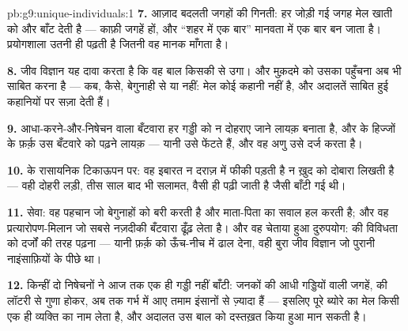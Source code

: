 \begin{solution}{pb:g9:unique-individuals:1}
\textbf{7.} आज़ाद बदलती जगहों की गिनती: हर जोड़ी गई जगह मेल खाती 
को और बाँट देती है --- काफ़ी जगहें हों, और ``शहर में एक बार'' मानवता में
एक बार बन जाता है। प्रयोगशाला उतनी ही पढ़ती है जितनी वह मानक माँगता है।

\textbf{8.} जीव विज्ञान यह दावा करता है कि वह बाल किसकी  से उगा।
और मुक़दमे को उसका पहुँचना अब भी साबित करना है --- कब, कैसे, बेगुनाही से
या नहीं: मेल कोई कहानी नहीं है, और अदालतें साबित हुई कहानियों पर सज़ा
देती हैं।

\textbf{9.} आधा-करने-और-निषेचन वाला बँटवारा हर गड्डी को न दोहराए जाने
लायक़ बनाता है, और  के हिज्जों के फ़र्क़ उस बँटवारे को पढ़ने लायक़ ---
यानी  उसे फेंटते हैं, और वह अणु उसे दर्ज करता है।

\textbf{10.}  के रासायनिक टिकाऊपन पर: वह इबारत न दराज़ में फीकी पड़ती
है न ख़ुद को दोबारा लिखती है --- वही दोहरी लड़ी, तीस साल बाद भी सलामत,
वैसी ही पढ़ी जाती है जैसी बाँटी गई थी।

\textbf{11.} सेवा: वह पहचान जो बेगुनाहों को बरी करती है और माता-पिता का
सवाल हल करती है; और वह प्रत्यारोपण-मिलान जो सबसे नज़दीकी बँटवारा ढूँढ़
लेता है। और वह चेताया हुआ दुरुपयोग:  की विविधता को दर्जों की तरह
पढ़ना --- यानी फ़र्क़ को ऊँच-नीच में ढाल देना, वही बुरा जीव विज्ञान जो
पुरानी नाइंसाफ़ियों के पीछे था।

\textbf{12.} किन्हीं दो निषेचनों ने आज तक एक ही गड्डी नहीं बाँटी: जनकों
की आधी गड्डियों वाली जगहें,  की लॉटरी से गुणा होकर, अब तक गर्भ
में आए तमाम इंसानों से ज़्यादा हैं --- इसलिए पूरे ब्योरे का मेल किसी एक
ही व्यक्ति का नाम लेता है, और अदालत उस बाल को दस्तख़त किया हुआ मान सकती
है।
\end{solution}
